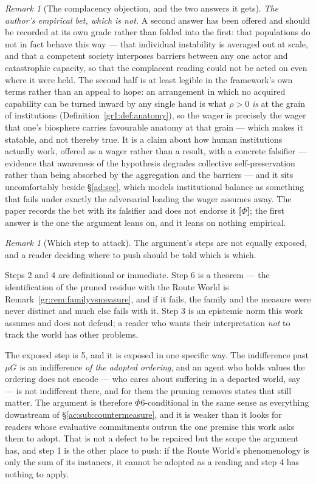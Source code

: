 \documentclass[11pt]{article}
\numberwithin{equation}{section}
\theoremstyle{plain}
\theoremstyle{definition}
\theoremstyle{remark}
\newtheorem{remark}[theorem]{Remark}
\begin{document}
\begin{remark}[The complacency objection, and the two answers it
gets]
\emph{The author's empirical bet, which is not.} A second answer has
been offered and should be recorded at its own grade rather than folded
into the first: that populations do not in fact behave this way ---
that individual instability is averaged out at scale, and that a
competent society interposes barriers between any one actor and
catastrophic capacity, so that the complacent reading could not be acted
on even where it were held. The second half is at least legible in the
framework's own terms rather than an appeal to hope: an arrangement in
which no acquired capability can be turned inward by any single hand is
what $\rho>0$ \emph{is} at the grain of institutions
(Definition~\ref{gr1:def:anatomy}), so the wager is precisely the wager
that one's biosphere carries favourable anatomy at that grain --- which
makes it statable, and not thereby true. It is a claim about how human
institutions actually work, offered as a wager rather than a result,
with a concrete falsifier --- evidence that awareness of the hypothesis
degrades collective self-preservation rather than being absorbed by the
aggregation and the barriers --- and it sits uncomfortably beside
\S\ref{ad:sec}, which models institutional balance as something that
fails under exactly the adversarial loading the wager assumes away. The
paper records the bet with its falsifier and does not endorse it
\textbf{[$\Phi$]}; the first answer is the one the argument leans on,
and it leans on nothing empirical.
\end{remark}

\begin{remark}[Which step to attack]\label{gc:rem:actingcost}
The argument's steps are not equally exposed, and a reader deciding
where to push should be told which is which.

Steps 2 and 4 are definitional or immediate. Step 6 is a theorem ---
the identification of the pruned residue with the Route World is
Remark~\ref{gr:rem:familyvsmeasure}, and if it fails, the family and the
measure were never distinct and much else fails with it. Step 3 is an
epistemic norm this work assumes and does not defend; a reader who wants
their interpretation \emph{not} to track the world has other problems.

The exposed step is 5, and it is exposed in one specific way. The
indifference past $\mu G$ is an indifference \emph{of the adopted
ordering}, and an agent who holds values the ordering does not encode
--- who cares about suffering in a departed world, say --- is not
indifferent there, and for them the pruning removes states that still
matter. The argument is therefore $\Phi6$-conditional in the same sense
as everything downstream of \S\ref{ac:sub:countermeasure}, and it is
weaker than it looks for readers whose evaluative commitments outrun the
one premise this work asks them to adopt. That is not a defect to be
repaired but the scope the argument has, and step 1 is the other place to
push: if the Route World's phenomenology is only the sum of its
instances, it cannot be adopted as a reading and step 4 has nothing to
apply.
\end{remark}
\end{document}
